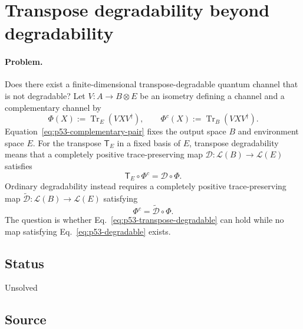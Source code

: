 \section{Transpose degradability beyond degradability}
\label{sec:op_7e7e4a25fef5c994}

\paragraph{Problem.}
Does there exist a finite-dimensional transpose-degradable quantum channel
that is not degradable?  Let $V:A\to B\otimes E$ be an isometry defining a
channel and a complementary channel by
\begin{equation}
  \Phi(X):=\operatorname{Tr}_E(VXV^\dagger),
  \qquad
  \Phi^c(X):=\operatorname{Tr}_B(VXV^\dagger).
  \label{eq:p53-complementary-pair}
\end{equation}
Equation~\eqref{eq:p53-complementary-pair} fixes the output space $B$ and
environment space $E$.  For the transpose $\mathsf T_E$ in a fixed basis of
$E$, transpose degradability means that a completely positive trace-preserving
map $\mathcal D:\mathcal L(B)\to\mathcal L(E)$ satisfies
\begin{equation}
  \mathsf T_E\circ\Phi^c=\mathcal D\circ\Phi.
  \label{eq:p53-transpose-degradable}
\end{equation}
Ordinary degradability instead requires a completely positive
trace-preserving map
$\widetilde{\mathcal D}:\mathcal L(B)\to\mathcal L(E)$ satisfying
\begin{equation}
  \Phi^c=\widetilde{\mathcal D}\circ\Phi.
  \label{eq:p53-degradable}
\end{equation}
The question is whether Eq.~\eqref{eq:p53-transpose-degradable} can hold while
no map satisfying Eq.~\eqref{eq:p53-degradable} exists.

\subsection*{Status}

Unsolved

\subsection*{Source}

